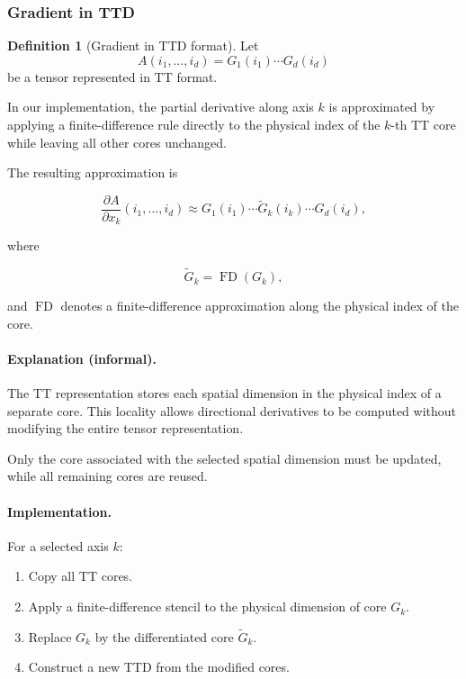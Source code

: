 \documentclass[11pt,a4paper,parskip=half-]{scrartcl}
\theoremstyle{definition}
\newtheorem{definition}{Definition}[section]
\theoremstyle{plain}
\theoremstyle{remark}
\begin{document}
\subsubsection{Gradient in TTD}
\label{sec:gradient_ttd}

\begin{definition}[Gradient in TTD format]

Let
\[
A(i_1,\dots,i_d)
=
G_1(i_1)\cdots G_d(i_d)
\]
be a tensor represented in TT format.

In our implementation, the partial derivative along axis $k$
is approximated by applying a finite-difference rule directly
to the physical index of the $k$-th TT core while leaving all
other cores unchanged.

The resulting approximation is

\[
\frac{\partial A}{\partial x_k}(i_1,\dots,i_d)
\approx
G_1(i_1)\cdots \widetilde{G}_k(i_k)\cdots G_d(i_d),
\]

where

\[
\widetilde{G}_k
=
\operatorname{FD}(G_k),
\]

and $\operatorname{FD}$ denotes a finite-difference approximation
along the physical index of the core.

\end{definition}

\paragraph{Explanation (informal).}

The TT representation stores each spatial dimension in the physical
index of a separate core. This locality allows directional derivatives
to be computed without modifying the entire tensor representation.

Only the core associated with the selected spatial dimension must be
updated, while all remaining cores are reused.

\paragraph{Implementation.}

For a selected axis $k$:

\begin{enumerate}
  \item Copy all TT cores.
  \item Apply a finite-difference stencil to the physical dimension
        of core $G_k$.
  \item Replace $G_k$ by the differentiated core
        $\widetilde{G}_k$.
  \item Construct a new TTD from the modified cores.
\end{enumerate}
\end{document}
